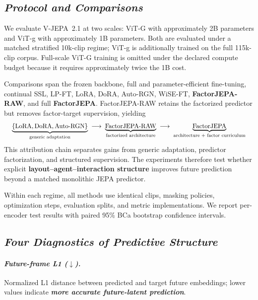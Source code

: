 \subsection{\textbf{\emph{Protocol and Comparisons}}}

We evaluate V-JEPA~2.1 at two scales: ViT-G with approximately 2B parameters
and ViT-g with approximately 1B parameters. Both are evaluated under a matched
stratified 10k-clip regime; ViT-g is additionally trained on the full
115k-clip corpus. Full-scale ViT-G training is omitted under the declared
compute budget because it requires approximately twice the 1B cost.

Comparisons span the frozen backbone, full and parameter-efficient fine-tuning,
continual SSL, LP-FT, LoRA, DoRA, Auto-RGN, WiSE-FT,
\textbf{FactorJEPA-RAW}, and full \textbf{FactorJEPA}. FactorJEPA-RAW retains
the factorized predictor but removes factor-target supervision, yielding
\begin{equation*}
\resizebox{0.98\columnwidth}{!}{$\displaystyle
\underbrace{\{\text{LoRA},\text{DoRA},\text{Auto-RGN}\}}_{\text{generic adaptation}}
\;\longrightarrow\;
\underbrace{\text{FactorJEPA-RAW}}_{\text{factorized architecture}}
\;\longrightarrow\;
\underbrace{\text{FactorJEPA}}_{\text{architecture + factor curriculum}}
$}
\end{equation*}
This attribution chain separates gains from generic adaptation, predictor
factorization, and structured supervision. The experiments therefore test
whether explicit \textbf{layout--agent--interaction structure} improves future
prediction beyond a matched monolithic JEPA predictor.

Within each regime, all methods use identical clips, masking policies,
optimization steps, evaluation splits, and metric implementations. We report
per-encoder test results with paired 95\% BCa bootstrap confidence intervals.

\subsection{\textbf{\emph{Four Diagnostics of Predictive Structure}}}

\paragraph{\textbf{\emph{Future-frame L1 ($\downarrow$).}}}
Normalized L1 distance between predicted and target future embeddings; lower
values indicate \textbf{\emph{more accurate future-latent prediction}}.

